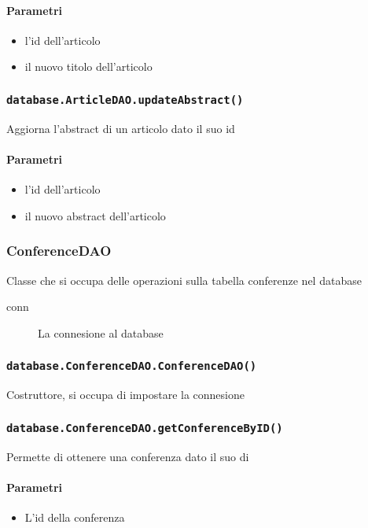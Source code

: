 \paragraph{Parametri}
\begin{itemize}
\item l'id dell'articolo              
\item il nuovo titolo dell'articolo
\end{itemize}

\subsubsection{\texttt{database.ArticleDAO.updateAbstract()}}
Aggiorna l'abstract di un articolo dato il suo id
\paragraph{Parametri}
\begin{itemize}
\item l'id dell'articolo              
\item il nuovo abstract dell'articolo
\end{itemize}

\subsubsection{ConferenceDAO}
Classe che si occupa delle operazioni sulla tabella conferenze nel database
\begin{description}
\item[conn] La connesione al database
\end{description}

\subsubsection{\texttt{database.ConferenceDAO.ConferenceDAO()}}
Costruttore, si occupa di impostare la connesione

\subsubsection{\texttt{database.ConferenceDAO.getConferenceByID()}}
Permette di ottenere una conferenza dato il suo di
\paragraph{Parametri}
\begin{itemize}
\item L'id della conferenza
\end{itemize}
